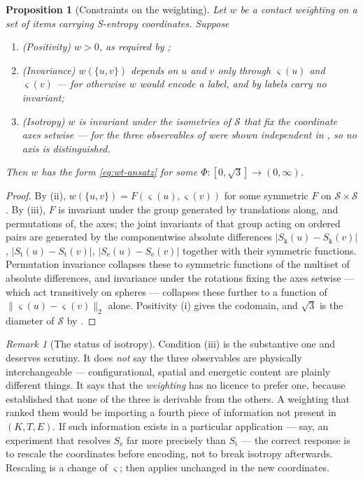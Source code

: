 \documentclass[11pt,twocolumn,a4paper]{article}
\theoremstyle{thmstyle}
\newtheorem{proposition}[theorem]{Proposition}
\theoremstyle{definition}
\theoremstyle{remark}
\newtheorem{remark}[theorem]{Remark}
\newcommand{\wt}{w}
\newcommand{\Sk}{S_{\mathrm{k}}}
\newcommand{\St}{S_{\mathrm{t}}}
\newcommand{\Se}{S_{\mathrm{e}}}
\newcommand{\Sspace}{\mathcal{S}}
\newcommand{\sse}{\varsigma}
\newcommand{\abs}[1]{\lvert#1\rvert}
\newcommand{\norm}[1]{\lVert#1\rVert}
\begin{document}
\begin{proposition}[Constraints on the weighting]
\label{prop:wt-constraints}
Let $\wt$ be a contact weighting on a set of items carrying S-entropy
coordinates. Suppose
\begin{enumerate}[label=(\roman*),leftmargin=*]
\item \emph{(Positivity)} $\wt > 0$, as required by
      ;
\item \emph{(Invariance)} $\wt(\{u,v\})$ depends on $u$ and $v$ only
      through $\sse(u)$ and $\sse(v)$ --- for otherwise $\wt$ would
      encode a label, and by  labels carry no
      invariant;
\item \emph{(Isotropy)} $\wt$ is invariant under the isometries of
      $\Sspace$ that fix the coordinate axes setwise --- for the three
      observables of  were shown independent in
      , so no axis is distinguished.
\end{enumerate}
Then $\wt$ has the form \eqref{eq:wt-ansatz} for some
$\Phi \colon [0,\sqrt3] \to (0,\infty)$.
\end{proposition}

\begin{proof}
By (ii), $\wt(\{u,v\}) = F(\sse(u),\sse(v))$ for some symmetric
$F$ on $\Sspace \times \Sspace$. By (iii), $F$ is invariant under the
group generated by translations along, and permutations of, the axes;
the joint invariants of that group acting on ordered pairs are
generated by the componentwise absolute differences
$\abs{\Sk(u)-\Sk(v)}$, $\abs{\St(u)-\St(v)}$, $\abs{\Se(u)-\Se(v)}$
together with their symmetric functions. Permutation invariance
collapses these to symmetric functions of the multiset of absolute
differences, and invariance under the rotations fixing the axes
setwise --- which act transitively on spheres --- collapses these
further to a function of $\norm{\sse(u)-\sse(v)}_2$ alone. Positivity
(i) gives the codomain, and $\sqrt3$ is the diameter of $\Sspace$ by
.
\end{proof}

\begin{remark}[The status of isotropy]
\label{rem:isotropy}
Condition (iii) is the substantive one and deserves scrutiny.
It does \emph{not} say the three observables are physically
interchangeable --- configurational, spatial and energetic content are
plainly different things. It says that the \emph{weighting} has no
licence to prefer one, because  established that none
of the three is derivable from the others. A weighting that ranked
them would be importing a fourth piece of information not present in
$(K,T,E)$. If such information exists in a particular application ---
say, an experiment that resolves $\Se$ far more precisely than $\St$
--- the correct response is to rescale the coordinates before
encoding, not to break isotropy afterwards. Rescaling is a change of
$\sse$;  then applies unchanged in the new
coordinates.
\end{remark}
\end{document}
